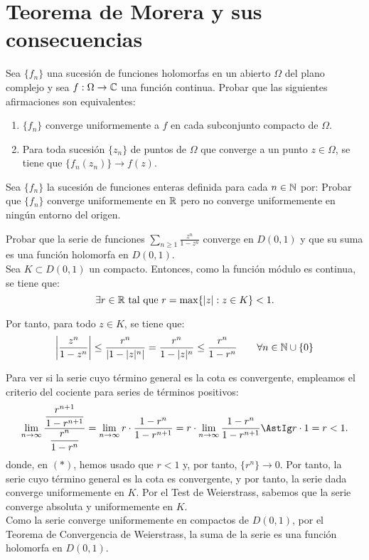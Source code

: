 \section{Teorema de Morera y sus consecuencias}

\begin{ejercicio}
    Sea $\{f_n\}$ una sucesión de funciones holomorfas en un abierto $\Omega$ del plano complejo y sea $f:\Omega\to\mathbb{C}$ una función continua. Probar que las siguientes afirmaciones son equivalentes:
    \begin{enumerate}
        \item $\{f_n\}$ converge uniformemente a $f$ en cada subconjunto compacto de $\Omega$.
        \item Para toda sucesión $\{z_n\}$ de puntos de $\Omega$ que converge a un punto $z\in\Omega$, se tiene que $\{f_n(z_n)\}\to f(z)$.
    \end{enumerate}
\end{ejercicio}

\begin{ejercicio}
    Sea $\{f_n\}$ la sucesión de funciones enteras definida para cada $n\in\mathbb{N}$ por:
    Probar que $\{f_n\}$ converge uniformemente en $\mathbb{R}$ pero no converge uniformemente en ningún entorno del origen.
\end{ejercicio}

\begin{ejercicio}
    Probar que la serie de funciones $\sum\limits_{n\geq 1} \frac{z^n}{1-z^n}$ converge en $D(0,1)$ y que su suma es una función holomorfa en $D(0,1)$.\\

    Sea $K\subset D(0,1)$ un compacto. Entonces, como la función módulo es continua, se tiene que:
    \[
    \exists r\in \bb{R}\ \text{tal que}\ r=\max\{|z| : z\in K\}<1.
    \]

    Por tanto, para todo $z\in K$, se tiene que:
    \[
    \left|\dfrac{z^n}{1-z^n}\right| \leq \dfrac{r^n}{\left|1-|z|^n\right|} = \dfrac{r^n}{1-|z|^n} \leq \dfrac{r^n}{1-r^n}\qquad \forall n\in \mathbb{N}\cup \{0\}
    \]

    Para ver si la serie cuyo término general es la cota es convergente, empleamos el criterio del cociente para series de términos positivos:
    \begin{equation*}
        \lim_{n\to\infty} \dfrac{\dfrac{r^{n+1}}{1-r^{n+1}}}{\dfrac{r^n}{1-r^n}}
        = \lim_{n\to\infty} r \cdot \dfrac{1-r^n}{1-r^{n+1}} = r\cdot \lim_{n\to\infty} \dfrac{1-r^n}{1-r^{n+1}} \AstIg r\cdot 1 = r < 1.
    \end{equation*}
    donde, en $(\ast)$, hemos usado que $r<1$ y, por tanto, $\{r^n\}\to 0$. Por tanto, la serie cuyo término general es la cota es convergente, y por tanto, la serie dada converge uniformemente en $K$. Por el Test de Weierstrass, sabemos que la serie converge absoluta y uniformemente en $K$.\\

    Como la serie converge uniformemente en compactos de $D(0,1)$, por el Teorema de Convergencia de Weierstrass, la suma de la serie es una función holomorfa en $D(0,1)$. 
\end{ejercicio}

